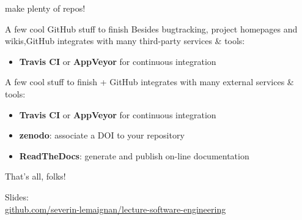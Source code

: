 \documentclass[compress]{beamer}
\begin{document}
\begin{frame}{}
    \centering

    make plenty of repos!
\end{frame}


\begin{frame}{A few cool GitHub stuff to finish}
    Besides bugtracking, project homepages and wikis,GitHub integrates with many
    third-party services \& tools:

    \begin{itemize}
        \item {\bf Travis CI} or {\bf AppVeyor} for continuous integration
    \end{itemize}
\end{frame}


\begin{frame}{A few cool stuff to finish}
    + GitHub integrates with many external services 
    \& tools:

    \begin{itemize}
        \item {\bf Travis CI} or {\bf AppVeyor} for continuous integration
        \item {\bf zenodo}: associate a DOI to your repository
        \item {\bf ReadTheDocs}: generate and publish on-line 
            documentation
    \end{itemize}
\end{frame}




\begin{frame}{}
    \begin{center}
        \Large
        That's all, folks!\\[2em]
    \end{center}

        \vspace{10em}

        Slides:\\
        \href{https://github.com/severin-lemaignan/lecture-software-engineering}{\small
        github.com/severin-lemaignan/lecture-software-engineering}


\end{frame}

\appendix

\end{document}

